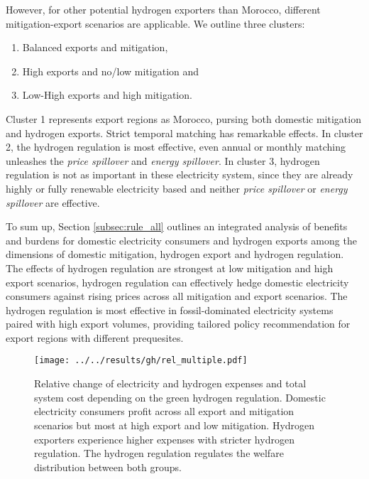 However, for other potential hydrogen exporters than Morocco, different mitigation-export scenarios are applicable. We outline three clusters:
\begin{enumerate}
    \item Balanced exports and mitigation, 
    \item High exports and no/low mitigation and
    \item Low-High exports and high mitigation.
\end{enumerate} 
Cluster 1 represents export regions as Morocco, pursing both domestic mitigation and hydrogen exports. Strict temporal matching has remarkable effects. In cluster 2, the hydrogen regulation is most effective, even annual or monthly matching unleashes the \textit{price spillover} and \textit{energy spillover}. In cluster 3, hydrogen regulation is not as important in these electricity system, since they are already highly or fully renewable electricity based and neither \textit{price spillover} or \textit{energy spillover} are effective.


To sum up, Section \ref{subsec:rule_all} outlines an integrated analysis of benefits and burdens for domestic electricity consumers and hydrogen exports among the dimensions of domestic mitigation, hydrogen export and hydrogen regulation. The effects of hydrogen regulation are strongest at low mitigation and high export scenarios, hydrogen regulation can effectively hedge domestic electricity consumers against rising prices across all mitigation and export scenarios. The hydrogen regulation is most effective in fossil-dominated electricity systems paired with high export volumes, providing tailored policy recommendation for export regions with different prequesites.


\begin{figure}[h!]
    \centering
    \texttt{[image: ../../results/gh/rel\_multiple.pdf]}
    \caption{Relative change of electricity and hydrogen expenses and total system cost depending on the green hydrogen regulation. Domestic electricity consumers profit across all export and mitigation scenarios but most at high export and low mitigation. Hydrogen exporters experience higher expenses with stricter hydrogen regulation. The hydrogen regulation regulates the welfare distribution between both groups.}
    \label{fig:expenses_all}
\end{figure}





